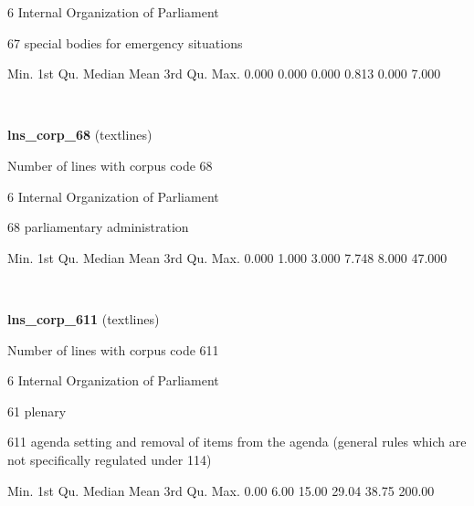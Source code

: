 \documentclass[]{article}
\newenvironment{Shaded}{\begin{snugshade}}{\end{snugshade}}
\newcommand{\FloatTok}[1]{\textcolor[rgb]{0.00,0.00,0.81}{{#1}}}
\newcommand{\NormalTok}[1]{{#1}}
\begin{document}
6 Internal Organization of Parliament

67 special bodies for emergency situations

\begin{Shaded}
\begin{Highlighting}[]
   \NormalTok{Min. 1st Qu.  Median    Mean 3rd Qu.    Max. }
  \FloatTok{0.000}   \FloatTok{0.000}   \FloatTok{0.000}   \FloatTok{0.813}   \FloatTok{0.000}   \FloatTok{7.000} 
\end{Highlighting}
\end{Shaded}

~

\vspace{1em}

\textbf{lns\_corp\_68} (textlines)

Number of lines with corpus code 68

6 Internal Organization of Parliament

68 parliamentary administration

\begin{Shaded}
\begin{Highlighting}[]
   \NormalTok{Min. 1st Qu.  Median    Mean 3rd Qu.    Max. }
  \FloatTok{0.000}   \FloatTok{1.000}   \FloatTok{3.000}   \FloatTok{7.748}   \FloatTok{8.000}  \FloatTok{47.000} 
\end{Highlighting}
\end{Shaded}

~

\vspace{1em}

\textbf{lns\_corp\_611} (textlines)

Number of lines with corpus code 611

6 Internal Organization of Parliament

61 plenary

611 agenda setting and removal of items from the agenda (general rules
which are not specifically regulated under 114)

\begin{Shaded}
\begin{Highlighting}[]
   \NormalTok{Min. 1st Qu.  Median    Mean 3rd Qu.    Max. }
   \FloatTok{0.00}    \FloatTok{6.00}   \FloatTok{15.00}   \FloatTok{29.04}   \FloatTok{38.75}  \FloatTok{200.00} 
\end{Highlighting}
\end{Shaded}

~

\vspace{1em}
\end{document}
